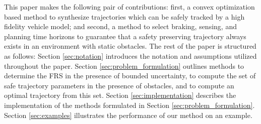 


This paper makes the following pair of contributions:
first, a convex optimization based method to synthesize trajectories which can be safely tracked by a high fidelity vehicle model;
and second, a method to select braking, sensing, and planning time horizons to guarantee that a safety preserving trajectory always exists in an environment with static obstacles.
The rest of the paper is structured as follows: 
Section \ref{sec:notation} introduces the notation and assumptions utilized throughout the paper.
Section \ref{sec:problem_formulation} outlines methods to determine the FRS in the presence of bounded uncertainty, to compute the set of safe trajectory parameters in the presence of obstacles, and to compute an optimal trajectory from this set.
Section \ref{sec:implementation} describes the implementation of the methods formulated in Section \ref{sec:problem_formulation}. 
Section \ref{sec:examples} illustrates the performance of our method on an example.

